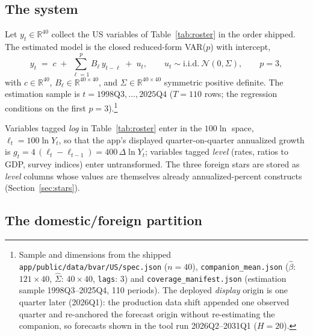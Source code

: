 \documentclass[11pt]{article}
\newcommand{\code}[1]{\texttt{\small #1}}
\begin{document}
\subsection{The system}

Let $y_t \in \mathbb{R}^{40}$ collect the US variables of Table~\ref{tab:roster} in the order
shipped. The estimated model is the closed reduced-form VAR($p$) with intercept,
\begin{equation}\label{eq:var}
  y_t \;=\; c \;+\; \sum_{\ell=1}^{p} B_\ell\, y_{t-\ell} \;+\; u_t,
  \qquad u_t \sim \text{i.i.d.}\ \mathcal{N}(0,\Sigma),
  \qquad p=3,
\end{equation}
with $c \in \mathbb{R}^{40}$, $B_\ell \in \mathbb{R}^{40\times40}$, and
$\Sigma \in \mathbb{R}^{40\times40}$ symmetric positive definite. The estimation sample is
$t = 1998\text{Q}3, \dots, 2025\text{Q}4$ ($T=110$ rows; the regression conditions on the first
$p=3$).\footnote{Sample and dimensions from the shipped
\code{app/public/data/bvar/US/spec.json} ($n=40$), \code{companion\_mean.json}
($\hat\beta$: $121\times40$, $\hat\Sigma$: $40\times40$, \code{lags}: 3) and
\code{coverage\_manifest.json} (estimation sample 1998Q3--2025Q4, 110 periods). The deployed
\emph{display} origin is one quarter later (2026Q1): the production data shift appended one
observed quarter and re-anchored the forecast origin without re-estimating the companion, so
forecasts shown in the tool run 2026Q2--2031Q1 ($H=20$).}

Variables tagged \emph{log} in Table~\ref{tab:roster} enter in the $100\ln$ space,
$\ell_t = 100\ln Y_t$, so that the app's displayed quarter-on-quarter annualized growth is
$g_t = 4\,(\ell_t - \ell_{t-1}) = 400\,\Delta \ln Y_t$; variables tagged \emph{level} (rates,
ratios to GDP, survey indices) enter untransformed. The three foreign stars are stored as
\emph{level} columns whose values are themselves already annualized-percent constructs
(Section~\ref{sec:stars}).

\subsection{The domestic/foreign partition}\label{sec:partition}
\end{document}
